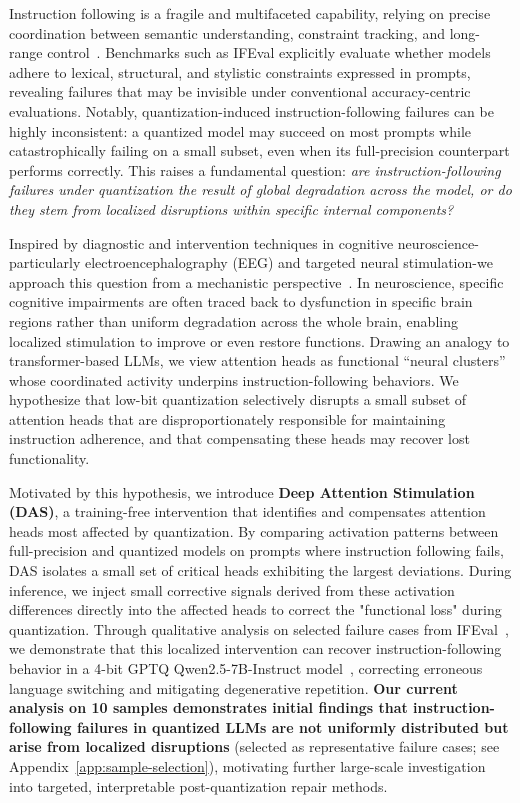 Instruction following is a fragile and multifaceted capability, relying on precise coordination between semantic understanding, constraint tracking, and long-range control~\citep{zhou2023ifeval}. 
Benchmarks such as IFEval explicitly evaluate whether models adhere to lexical, structural, and stylistic constraints expressed in prompts, revealing failures that may be invisible under conventional accuracy-centric evaluations. 
Notably, quantization-induced instruction-following failures can be highly inconsistent: a quantized model may succeed on most prompts while catastrophically failing on a small subset, even when its full-precision counterpart performs correctly. 
This raises a fundamental question: \emph{are instruction-following failures under quantization the result of global degradation across the model, or do they stem from localized disruptions within specific internal components?}

Inspired by diagnostic and intervention techniques in cognitive neuroscience-particularly electroencephalography (EEG) and targeted neural stimulation-we approach this question from a mechanistic perspective~\citep{dayan2001theoretical,buzsaki2006rhythms}. 
In neuroscience, specific cognitive impairments are often traced back to dysfunction in specific brain regions rather than uniform degradation across the whole brain, enabling localized stimulation to improve or even restore functions. 
Drawing an analogy to transformer-based LLMs, we view attention heads as functional “neural clusters” whose coordinated activity underpins instruction-following behaviors. 
We hypothesize that low-bit quantization selectively disrupts a small subset of attention heads that are disproportionately responsible for maintaining instruction adherence, and that compensating these heads may recover lost functionality.

Motivated by this hypothesis, we introduce \textbf{Deep Attention Stimulation (DAS)}, 
a training-free intervention that identifies and compensates attention heads most affected by quantization.
By comparing activation patterns between full-precision and quantized models on prompts where instruction following fails, DAS isolates a small set of critical heads exhibiting the largest deviations.
During inference, we inject small corrective signals derived from these activation differences directly into the affected heads to correct the "functional loss" during quantization.
Through qualitative analysis on selected failure cases from IFEval~\citep{zhou2023ifeval}, we demonstrate that this localized intervention can recover instruction-following behavior in a 4-bit GPTQ Qwen2.5-7B-Instruct model~\citep{wang2023qwen,frantar2022gptq}, correcting erroneous language switching and mitigating degenerative repetition.
\textbf{Our current analysis on 10 samples demonstrates initial findings that instruction-following failures in quantized LLMs are not uniformly distributed but arise from localized disruptions}
(selected as representative failure cases; see Appendix~\ref{app:sample-selection}),
motivating further large-scale investigation into targeted, interpretable post-quantization repair methods.

